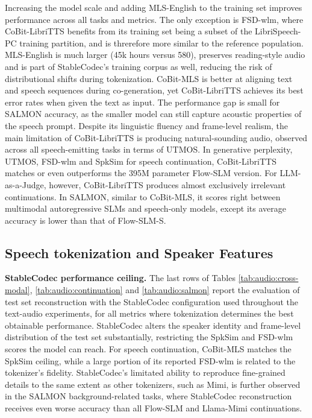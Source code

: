 Increasing the model scale and adding MLS-English to the training set improves performance across all tasks and metrics. The only exception is FSD-wlm, where CoBit-LibriTTS benefits from its training set being a subset of the LibriSpeech-PC training partition, and is threrefore more similar to the reference population. MLS-English is much larger (45k hours versus 580), preserves reading-style audio and is part of StableCodec's training corpus as well, reducing the risk of distributional shifts during tokenization. CoBit-MLS is better at aligning text and speech sequences during co-generation, yet CoBit-LibriTTS achieves its best error rates when given the text as input. The performance gap is small for SALMON accuracy, as the smaller model can still capture acoustic properties of the speech prompt. Despite its linguistic fluency and frame-level realism, the main limitation of CoBit-LibriTTS is producing natural-sounding audio, observed across all speech-emitting tasks in terms of UTMOS. In generative perplexity, UTMOS, FSD-wlm and SpkSim for speech continuation, CoBit-LibriTTS matches or even outperforms the 395M parameter Flow-SLM version. For LLM-as-a-Judge, however, CoBit-LibriTTS produces almost exclusively irrelevant continuations.  In SALMON, similar to CoBit-MLS, it scores right between multimodal autoregressive SLMs and speech-only models, except its average accuracy is lower than that of Flow-SLM-S.

\subsection{Speech tokenization and Speaker Features} \label{app:audio:speech-tokenization}

\textbf{StableCodec performance ceiling.} The last rows of Tables \ref{tab:audio:cross-modal}, \ref{tab:audio:continuation} and \ref{tab:audio:salmon} report the evaluation of test set reconstruction with the StableCodec configuration used throughout the text-audio experiments, for all metrics where tokenization determines the best obtainable performance. StableCodec alters the speaker identity and frame-level distribution of the test set substantially, restricting the SpkSim and FSD-wlm scores the model can reach. For speech continuation, CoBit-MLS matches the SpkSim ceiling, while a large portion of its reported FSD-wlm is related to the tokenizer's fidelity. StableCodec's limitated ability to reproduce fine-grained details to the same extent as other tokenizers, such as Mimi, is further observed in the SALMON background-related tasks, where StableCodec reconstruction receives even worse accuracy than all Flow-SLM and Llama-Mimi continuations.

